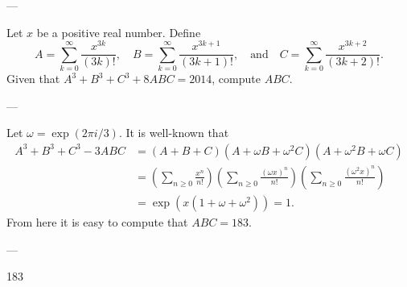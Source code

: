 
---

Let $x$ be a positive real number. Define \[A=\sum_{k=0}^\infty\frac{x^{3k}}{(3k)!},\quad B=\sum_{k=0}^\infty\frac{x^{3k+1}}{(3k+1)!},\quad\text{and}\quad C=\sum_{k=0}^\infty\frac{x^{3k+2}}{(3k+2)!}.\]
Given that $A^3+B^3+C^3+8ABC=2014$, compute $ABC$.

---

Let $\omega=\exp(2\pi i/3)$. It is well-known that
\begin{align*}
    A^3+B^3+C^3-3ABC&=(A+B+C)(A+\omega B+\omega^2 C)(A+\omega^2 B+\omega C)\\
    &=\left(\sum_{n\ge0}\frac{x^n}{n!}\right)\left(\sum_{n\ge0}\frac{(\omega x)^n}{n!}\right)\left(\sum_{n\ge0}\frac{(\omega^2x)^n}{n!}\right)\\
    &=\exp\left(x(1+\omega+\omega^2)\right)=1.
\end{align*}
From here it is easy to compute that $ABC=183$.

---

183
